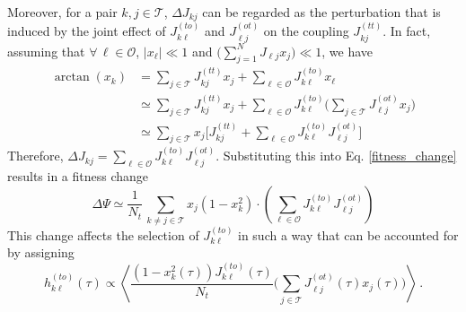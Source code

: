 \documentclass[%
 reprint,
superscriptaddress,
 amsmath,amssymb,
 prl,
]{revtex4-2}
\begin{document}
Moreover, for a pair $k, j\in \mathcal{T}$,  $\Delta J_{kj}$ can be regarded as the perturbation that is induced  by the joint effect of $J_{k\ell}^{(to)}$ and $J_{\ell j}^{(ot)}$ on the coupling $J_{kj}^{(tt)}$. In fact, assuming that $\forall \, \ell \in \mathcal{O}$, $|x_\ell| \ll 1$ and $\Big(\sum_{j=1}^N J_{ \ell j}x_j \Big) \ll 1$, we have
\begin{align} \nonumber
{\arctan}(x_k) &= \sum_{j\in \mathcal{T}} J_{kj}^{(tt)} x_j + \sum_{\ell \in \mathcal{O}} J^{(to)}_{k\ell}x_\ell\\\nonumber
 &\simeq  \sum_{j\in \mathcal{T}} J_{kj}^{(tt)} x_j + \sum_{\ell \in \mathcal{O}} J^{(to)}_{k\ell}\Big(\sum_{j\in \mathcal{T}} J_{ \ell j}^{(ot)}x_j \Big)  \\ \nonumber 
 &\simeq  \sum_{j\in \mathcal{T}}  x_j \Big[J_{kj}^{(tt)} +  \sum_{\ell \in \mathcal{O}} J^{(to)}_{k\ell}J_{ \ell j}^{(ot)}\Big] 
\end{align}
Therefore, $\Delta J_{kj} = \sum_{\ell \in \mathcal{O}} J_{k\ell}^{(to)} J_{\ell j}^{(ot)}$. %
Substituting this into Eq. \eqref{fitness_change} results in a fitness change 
 \begin{equation*}   \Delta \Psi \simeq  \frac{1}{N_t}\, \sum_{k\neq j \in \mathcal{T}}   x_j(1- x_k^2)\cdot  \left( \sum_{\ell \in \mathcal{O}} J_{k\ell}^{(to)} J_{\ell j}^{(ot)}\right) \end{equation*}
This change affects the selection of $J_{k\ell}^{(to)}$ in such a way that can be  accounted for by assigning 
 \begin{equation} 
  h_{k\ell}^{(to)} (\tau) \propto \left\langle  \frac{ (1- x_k^2(\tau))J_{k\ell}^{(to)}(\tau)}{N_t} \Big(\sum_{j\in \mathcal{T}} J_{\ell j}^{(ot)} (\tau)x_j(\tau)\Big)\right \rangle\,. \label{h_for_Jto}
  \end{equation}  
 
\end{document}

